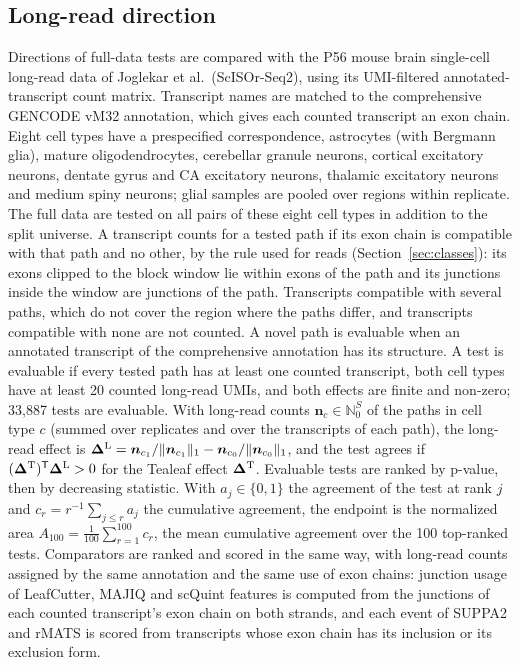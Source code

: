 \documentclass[11pt]{article}
\begin{document}
\subsection{Long-read direction}

Directions of full-data tests are compared with the P56 mouse brain single-cell long-read data of Joglekar et al.\ (ScISOr-Seq2), using its UMI-filtered annotated-transcript count matrix. Transcript names are matched to the comprehensive GENCODE vM32 annotation, which gives each counted transcript an exon chain. Eight cell types have a prespecified correspondence, astrocytes (with Bergmann glia), mature oligodendrocytes, cerebellar granule neurons, cortical excitatory neurons, dentate gyrus and CA excitatory neurons, thalamic excitatory neurons and medium spiny neurons; glial samples are pooled over regions within replicate. The full data are tested on all pairs of these eight cell types in addition to the split universe. A transcript counts for a tested path if its exon chain is compatible with that path and no other, by the rule used for reads (Section~\ref{sec:classes}): its exons clipped to the block window lie within exons of the path and its junctions inside the window are junctions of the path. Transcripts compatible with several paths, which do not cover the region where the paths differ, and transcripts compatible with none are not counted. A novel path is evaluable when an annotated transcript of the comprehensive annotation has its structure. A test is evaluable if every tested path has at least one counted transcript, both cell types have at least 20 counted long-read UMIs, and both effects are finite and non-zero; 33{,}887 tests are evaluable. With long-read counts $\bm n_c\in\mathbb N_0^S$ of the paths in cell type $c$ (summed over replicates and over the transcripts of each path), the long-read effect is $\bm\Delta^{\rm L}=\bm n_{c_1}/\|\bm n_{c_1}\|_1-\bm n_{c_0}/\|\bm n_{c_0}\|_1$, and the test agrees if $(\bm\Delta^{\rm T})^{\mathsf T}\bm\Delta^{\rm L}>0$ for the Tealeaf effect $\bm\Delta^{\rm T}$. Evaluable tests are ranked by p-value, then by decreasing statistic. With $a_j\in\{0,1\}$ the agreement of the test at rank $j$ and $c_r=r^{-1}\sum_{j\le r}a_j$ the cumulative agreement, the endpoint is the normalized area $A_{100}=\frac{1}{100}\sum_{r=1}^{100}c_r$, the mean cumulative agreement over the 100 top-ranked tests. Comparators are ranked and scored in the same way, with long-read counts assigned by the same annotation and the same use of exon chains: junction usage of LeafCutter, MAJIQ and scQuint features is computed from the junctions of each counted transcript's exon chain on both strands, and each event of SUPPA2 and rMATS is scored from transcripts whose exon chain has its inclusion or its exclusion form.
\end{document}

